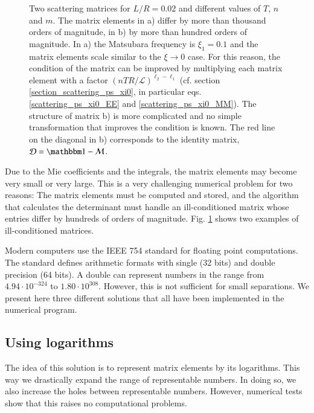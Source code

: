 \begin{figure}
  \caption{Two scattering matrices for $L/R=0.02$ and different values of $T$, $n$ and $m$. The matrix elements
  in a) differ by more than thousand orders of magnitude, in b)
  by more than hundred orders of magnitude.
  In a) the Matsubara frequency is $\xi_1=0.1$
  and the matrix elements scale similar to the $\xi\to0$ case. For this reason, the condition
  of the matrix can be improved by multiplying each matrix element with a factor $(nTR/\mathcal{L})^{\ell_2-\ell_1}$
  (cf. section \ref{section_scattering_ps_xi0}, in particular eqs. \eqref{scattering_ps_xi0_EE} and \eqref{scattering_ps_xi0_MM}).
  The structure of matrix b) is more complicated and no simple transformation that improves the condition is known.
  The red line on the diagonal in b) corresponds to the identity matrix, $\mathcal{D}=\Id-\mathcal{M}$.
  }
  \label{fig:numerical_matrix_elements}
\end{figure}

Due to the Mie coefficients and the integrals, the matrix elements may become
very small or very large. This is a very challenging numerical problem for two
reasons: The matrix elements must be computed and stored, and the algorithm
that calculates the determinant must handle an ill-conditioned matrix whose
entries differ by hundreds of orders of magnitude. Fig. \ref{fig:numerical_matrix_elements}
shows two examples of ill-conditioned matrices.

Modern computers use the IEEE 754 standard \cite{IEEE:1985:AIS} for floating
point computations. The standard defines arithmetic formats with single
(32 bits) and double precision (64 bits). A double can represent
numbers in the range from $4.94\cdot10^{-324}$ to $1.80\cdot10^{308}$. However,
this is not sufficient for small separations.
We present here three different solutions that all have been implemented
in the numerical program.


\subsection{Using logarithms}

The idea of this solution is to represent matrix elements by its logarithms.
This way we drastically expand the range of representable
numbers. In doing so, we also increase the holes between representable numbers.
However, numerical tests show that this raises no computational problems.

